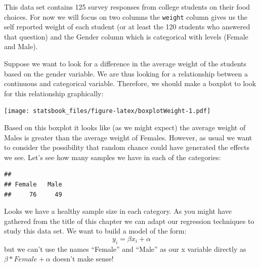 \documentclass[
]{book}
\newenvironment{Shaded}{\begin{snugshade}}{\end{snugshade}}
\newcommand{\AttributeTok}[1]{\textcolor[rgb]{0.77,0.63,0.00}{#1}}
\newcommand{\FunctionTok}[1]{\textcolor[rgb]{0.00,0.00,0.00}{#1}}
\newcommand{\NormalTok}[1]{#1}
\newcommand{\SpecialCharTok}[1]{\textcolor[rgb]{0.00,0.00,0.00}{#1}}
\newcommand{\StringTok}[1]{\textcolor[rgb]{0.31,0.60,0.02}{#1}}
\theoremstyle{definition}
\theoremstyle{definition}
\theoremstyle{definition}
\theoremstyle{definition}
\theoremstyle{remark}
\begin{document}
This data set contains 125 survey responses from college students on their food choices. For now we will focus on two columns the \texttt{weight} column gives us the self reported weight of each student (or at least the 120 students who answered that question) and the Gender column which is categorical with levels (Female and Male).

Suppose we want to look for a difference in the average weight of the students based on the gender variable. We are thus looking for a relationship between a continuous and categorical variable. Therefore, we should make a boxplot to look for this relationship graphically:

\begin{Shaded}
\end{Shaded}

\texttt{[image: statsbook\_files/figure-latex/boxplotWeight-1.pdf]}

Based on this boxplot it looks like (as we might expect) the average weight of Males is greater than the average weight of Females. However, as usual we want to consider the possibility that random chance could have generated the effects we see. Let's see how many samples we have in each of the categories:

\begin{Shaded}
\end{Shaded}

\begin{verbatim}
## 
## Female   Male 
##     76     49
\end{verbatim}

Looks we have a healthy sample size in each category. As you might have gathered from the title of this chapter we can adapt our regression techniques to study this data set. We want to build a model of the form: \[ y_i=\beta x_i +\alpha\] but we can't use the names ``Female'' and ``Male'' as our x variable directly as \(\beta*Female+\alpha\) doesn't make sense!
\end{document}
